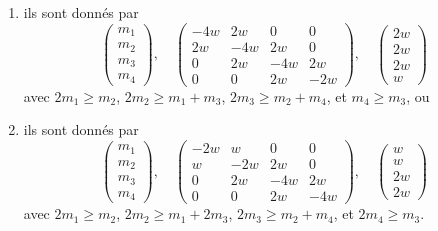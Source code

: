 \begin{lemma}
\begin{enumerate}
$$\begin{matrix}
m_4
\end{matrix}
\right),
\quad
\left(
\begin{matrix}
-2w & w & 0 & 0 \\
w & -2w & w & 0 \\
0 & w & -2w & 2w \\
0 & 0 & 2w & -4w 
\end{matrix}
\right),
\quad
\left(
\begin{matrix}
w \\
w \\
w \\
2w
\end{matrix}
\right)
$$
avec $2m_1 \geq m_2$, $2m_2 \geq m_1 + m_3$, $2m_3 \geq m_2 + 2m_4$,
et $2m_4 \geq m_3$, ou
\item
\label{item-B4}
ils sont donnés par
$$
\left(
\begin{matrix}
m_1 \\
m_2 \\
m_3 \\
m_4
\end{matrix}
\right),
\quad
\left(
\begin{matrix}
-4w & 2w & 0 & 0 \\
2w & -4w & 2w & 0 \\
0 & 2w & -4w & 2w \\
0 & 0 & 2w & -2w 
\end{matrix}
\right),
\quad
\left(
\begin{matrix}
2w \\
2w \\
2w \\
w
\end{matrix}
\right)
$$
avec $2m_1 \geq m_2$, $2m_2 \geq m_1 + m_3$, $2m_3 \geq m_2 + m_4$,
et $m_4 \geq m_3$, ou
\item
\label{item-F4}
ils sont donnés par
$$
\left(
\begin{matrix}
m_1 \\
m_2 \\
m_3 \\
m_4
\end{matrix}
\right),
\quad
\left(
\begin{matrix}
-2w & w & 0 & 0 \\
w & -2w & 2w & 0 \\
0 & 2w & -4w & 2w \\
0 & 0 & 2w & -4w 
\end{matrix}
\right),
\quad
\left(
\begin{matrix}
w \\
w \\
2w \\
2w
\end{matrix}
\right)
$$
avec $2m_1 \geq m_2$, $2m_2 \geq m_1 + 2m_3$, $2m_3 \geq m_2 + m_4$,
et $2m_4 \geq m_3$.
\end{enumerate}
\end{lemma}

